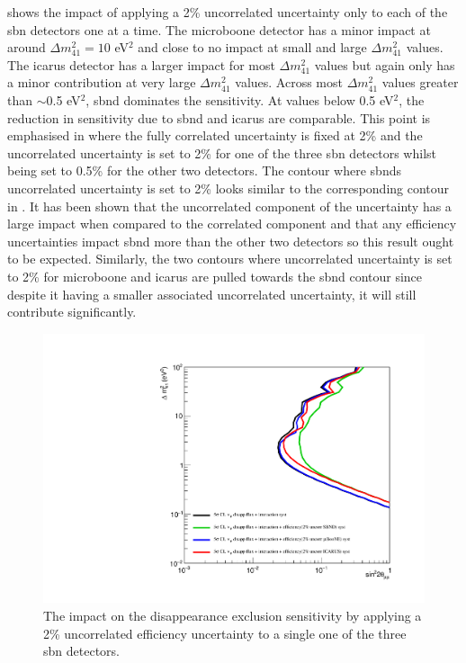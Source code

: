  shows the impact of applying a 2\% uncorrelated uncertainty only to each of the \gls{sbn} detectors one at a time. The \gls{microboone} detector has a minor impact at around $\Delta m ^2_{41} = 10$ eV$^2$ and close to no impact at small and large $\Delta m ^2_{41}$ values. The \gls{icarus} detector has a larger impact for most $\Delta m ^2_{41}$ values but again only has a minor contribution at very large $\Delta m ^2_{41}$ values. Across most $\Delta m ^2_{41}$ values greater than $\sim$0.5 eV$^2$, \gls{sbnd} dominates the sensitivity. At values below 0.5 eV$^2$, the reduction in sensitivity due to \gls{sbnd} and \gls{icarus} are comparable. This point is emphasised in  where the fully correlated uncertainty is fixed at 2\% and the uncorrelated uncertainty is set to 2\% for one of the three \gls{sbn} detectors whilst being set to 0.5\% for the other two detectors. The contour where \glspl{sbnd} uncorrelated uncertainty is set to 2\% looks similar to the corresponding contour in . It has been shown that the uncorrelated component of the uncertainty has a large impact when compared to the correlated component and that any efficiency uncertainties impact \gls{sbnd} more than the other two detectors so this result ought to be expected. Similarly, the two contours where uncorrelated uncertainty is set to 2\% for \gls{microboone} and \gls{icarus} are pulled towards the \gls{sbnd} contour since despite it having a smaller associated uncorrelated uncertainty, it will still contribute significantly. 

\begin{figure}[!h]
    \centering
    \includegraphics[width = \largefigwidth]{figures-chap6/exclusion_contours/efficiency_systematics/numu_disapp_2pct_uncor_per_detector.pdf}
    \caption[Impact of a 2\% uncorrelated efficiency systematic on the \numu disappearance channel for each individual detector.]{The impact on the \numu disappearance exclusion sensitivity by applying a 2\% uncorrelated efficiency uncertainty to a single one of the three \gls{sbn} detectors.}
    \label{fig:numu_uncorr_det}
\end{figure}

